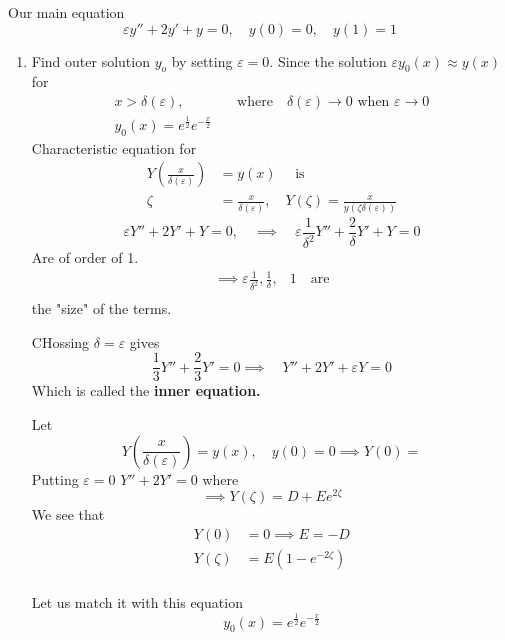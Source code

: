 \documentclass{article}
\theoremstyle{remark}
\newcommand{\newpara}
  {
  \vskip 0.4cm
  }
\begin{document}
Our main equation \[
\varepsilon y''  + 2 y'   + y = 0, \quad  y\left( 0 \right) = 0,  \quad    y\left( 1 \right) = 1
\] 
\begin{enumerate}[label=(\roman*)]
  \item Find outer solution $y_{o}$ by setting $\varepsilon  = 0$. Since the solution $\varepsilon y_{0}\left( x \right) \approx y\left( x \right)$ for \[
      \begin{split}
  x > \delta \left( \varepsilon  \right), &  \quad \text{where}\quad \delta \left( \varepsilon  \right) \to 0 \text{ when } \varepsilon \to 0   \\
 y_{0}\left( x \right) = e ^{\frac{1}{2}} e^{-\frac{x}{2}} 
      \end{split} 
  \] 
  Characteristic equation for \[
    \begin{split}
  Y\left( \frac{x}{\delta \left( \varepsilon  \right)} \right) &= y\left( x \right) \quad \text{ is}  \\
  \zeta   & = \frac{x}{\delta \left( \varepsilon  \right)},    \quad  Y\left( \zeta  \right) = \frac{x}{y\left( \zeta \delta \left( \varepsilon  \right) \right)}
    \end{split} 
  \] 
  \[
  \varepsilon Y'' + 2 Y'  + Y = 0, \quad  \implies  \quad  \varepsilon \frac{1}{\delta ^2} Y''  + \frac{2}{\delta } Y' + Y =0  
  \] 
  Are of order of 1. \[
  \begin{split}
    \implies  \varepsilon \frac{1}{\delta ^2} , \frac{1}{\delta },  & 1 \quad \text{are} \\
  \end{split} 
  \] 
  the "size" of the terms. 
  
  \newpara
  CHossing $\delta =\varepsilon $ gives \[
  \frac{1}{3} Y'' + \frac{2}{3} Y'  = 0 \implies \quad  Y'' + 2Y'  + \varepsilon Y = 0
  \] 
  Which is called the \textbf{inner equation.} 

\newpara
Let \[
Y\left( \frac{x}{\delta \left( \varepsilon  \right)} \right) = y\left( x \right), \quad y\left( 0 \right) = 0 \implies  Y\left( 0 \right) =  
\] 
Putting $ \varepsilon  = 0$ $Y'' + 2 Y'  = 0$ where \[
\implies  Y\left( \zeta  \right) = D + E e ^{2\zeta }
\] 
We see that \[
\begin{split}
Y\left( 0 \right)  & = 0 \implies  E = -D \\
Y\left( \zeta  \right) &= E\left( 1- e^{-2\zeta } \right) \\
\end{split} 
\] 

Let us match it with this equation \[
y_{0}\left( x \right) = e^{\frac{1}{2}} e^{-\frac{x}{2}}
\] 


\end{enumerate}
\end{document}
